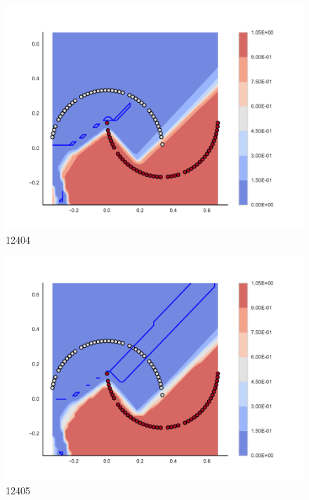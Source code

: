 \begin{subfigure}[b]{0.09\textwidth}
    \includegraphics[clip, trim=2.35cm 1.75cm 4.5cm 0cm,width=\textwidth]{img/convergence/12404.pdf}
    \caption{12404}
    \label{fig:convergence_12404}
\end{subfigure}
%
\begin{subfigure}[b]{0.09\textwidth}
    \includegraphics[clip, trim=2.35cm 1.75cm 4.5cm 0cm,width=\textwidth]{img/convergence/12405.pdf}
    \caption{12405}
    \label{fig:convergence_12405}
\end{subfigure}
%
